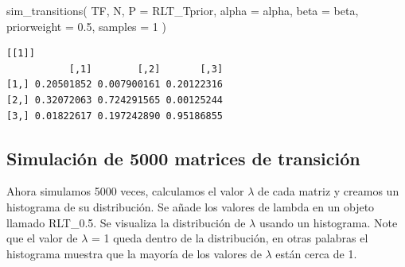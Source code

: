 \documentclass[
  12pt,
  letterpaper,
]{book}
\newenvironment{Shaded}{\begin{snugshade}}{\end{snugshade}}
\newcommand{\AttributeTok}[1]{\textcolor[rgb]{0.40,0.45,0.13}{#1}}
\newcommand{\DecValTok}[1]{\textcolor[rgb]{0.68,0.00,0.00}{#1}}
\newcommand{\FloatTok}[1]{\textcolor[rgb]{0.68,0.00,0.00}{#1}}
\newcommand{\FunctionTok}[1]{\textcolor[rgb]{0.28,0.35,0.67}{#1}}
\newcommand{\NormalTok}[1]{\textcolor[rgb]{0.00,0.23,0.31}{#1}}
\begin{document}
\begin{Shaded}
\begin{Highlighting}[]
\FunctionTok{sim\_transitions}\NormalTok{(}
\NormalTok{  TF,}
\NormalTok{  N,}
  \AttributeTok{P =}\NormalTok{ RLT\_Tprior,}
  \AttributeTok{alpha =}\NormalTok{ alpha,}
  \AttributeTok{beta =}\NormalTok{ beta,}
  \AttributeTok{priorweight =} \FloatTok{0.5}\NormalTok{,}
  \AttributeTok{samples =} \DecValTok{1}
\NormalTok{)}
\end{Highlighting}
\end{Shaded}

\begin{verbatim}
[[1]]
           [,1]        [,2]       [,3]
[1,] 0.20501852 0.007900161 0.20122316
[2,] 0.32072063 0.724291565 0.00125244
[3,] 0.01822617 0.197242890 0.95186855
\end{verbatim}

\subsection{Simulación de 5000 matrices de
transición}\label{simulaciuxf3n-de-5000-matrices-de-transiciuxf3n}

Ahora simulamos 5000 veces, calculamos el valor \(\lambda\) de cada
matriz y creamos un histograma de su distribución. Se añade los valores
de lambda en un objeto llamado RLT\_0.5. Se visualiza la distribución de
\(\lambda\) usando un histograma. Note que el valor de \(\lambda\) = 1
queda dentro de la distribución, en otras palabras el histograma muestra
que la mayoría de los valores de \(\lambda\) están cerca de 1.
\end{document}
